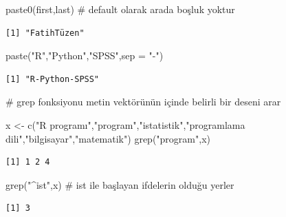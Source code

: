 \documentclass[
  letterpaper,
  DIV=11,
  numbers=noendperiod]{scrreprt}
\newenvironment{Shaded}{\begin{snugshade}}{\end{snugshade}}
\newcommand{\AttributeTok}[1]{\textcolor[rgb]{0.40,0.45,0.13}{#1}}
\newcommand{\CommentTok}[1]{\textcolor[rgb]{0.37,0.37,0.37}{#1}}
\newcommand{\FunctionTok}[1]{\textcolor[rgb]{0.28,0.35,0.67}{#1}}
\newcommand{\NormalTok}[1]{\textcolor[rgb]{0.00,0.23,0.31}{#1}}
\newcommand{\OtherTok}[1]{\textcolor[rgb]{0.00,0.23,0.31}{#1}}
\newcommand{\StringTok}[1]{\textcolor[rgb]{0.13,0.47,0.30}{#1}}
\begin{document}
\begin{Shaded}
\begin{Highlighting}[]
\FunctionTok{paste0}\NormalTok{(first,last) }\CommentTok{\# default olarak arada boşluk yoktur}
\end{Highlighting}
\end{Shaded}

\begin{verbatim}
[1] "FatihTüzen"
\end{verbatim}

\begin{Shaded}
\begin{Highlighting}[]
\FunctionTok{paste}\NormalTok{(}\StringTok{"R"}\NormalTok{,}\StringTok{"Python"}\NormalTok{,}\StringTok{"SPSS"}\NormalTok{,}\AttributeTok{sep =} \StringTok{"{-}"}\NormalTok{)}
\end{Highlighting}
\end{Shaded}

\begin{verbatim}
[1] "R-Python-SPSS"
\end{verbatim}

\begin{Shaded}
\begin{Highlighting}[]
\CommentTok{\# grep fonksiyonu metin vektörünün içinde belirli bir deseni arar}

\NormalTok{x }\OtherTok{\textless{}{-}} \FunctionTok{c}\NormalTok{(}\StringTok{"R programı"}\NormalTok{,}\StringTok{"program"}\NormalTok{,}\StringTok{"istatistik"}\NormalTok{,}\StringTok{"programlama dili"}\NormalTok{,}\StringTok{"bilgisayar"}\NormalTok{,}\StringTok{"matematik"}\NormalTok{)}
\FunctionTok{grep}\NormalTok{(}\StringTok{"program"}\NormalTok{,x)}
\end{Highlighting}
\end{Shaded}

\begin{verbatim}
[1] 1 2 4
\end{verbatim}

\begin{Shaded}
\begin{Highlighting}[]
\FunctionTok{grep}\NormalTok{(}\StringTok{"\^{}ist"}\NormalTok{,x) }\CommentTok{\# ist ile başlayan ifdelerin olduğu yerler}
\end{Highlighting}
\end{Shaded}

\begin{verbatim}
[1] 3
\end{verbatim}
\end{document}
